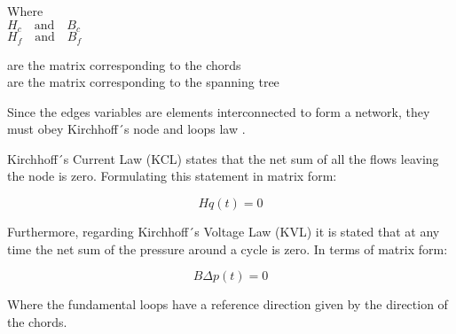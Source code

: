 \begin{minipage}[t]{0.20\textwidth}
Where\\
\hspace*{8mm} $H_c \quad \text{and} \quad B_c$ \\
\hspace*{8mm} $H_f \quad \text{and} \quad B_f$ 
\end{minipage}
\begin{minipage}[t]{0.68\textwidth}
\vspace*{2mm}
\hspace*{8mm} are the matrix corresponding to the chords\\
\hspace*{8mm} are the matrix corresponding to the spanning tree 
\end{minipage}

Since the edges variables are elements interconnected to form a network, 
they must obey Kirchhoff´s node and loops law \cite{GraphModel}. 

Kirchhoff´s Current Law (KCL) states that the net sum of all the flows 
leaving the node is zero. Formulating this statement in matrix form:

\begin{equation}
  \label{KCL}
  Hq(t) = 0
\end{equation}

Furthermore, regarding Kirchhoff´s Voltage Law (KVL) it is stated that at any time the net sum of the pressure around a cycle 
is zero. In terms of matrix form:

\begin{equation}
 \label{KVL} 
 B\Delta p (t) = 0
\end{equation}

Where the fundamental loops have a reference direction given by the direction of the 
chords. 





 